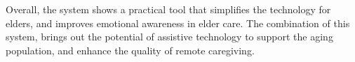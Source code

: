 { 
	\setlength{\leftskip}{1cm}
	\setlength{\parindent}{2.5em}
	Overall, the system shows a practical tool that simplifies the technology for elders, and improves emotional awareness in elder care. The combination of this system, brings out the potential of assistive technology to support the aging population, and enhance the quality of remote caregiving.
	\par
}